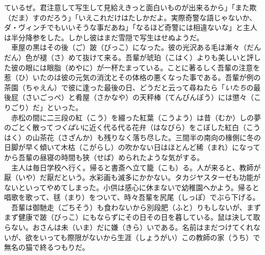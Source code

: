 \documentclass{book}
\begin{document}
ているぜ。君注意して写生して見給えきっと面白いものが出来るから」「また欺（だま）すのだろう」「いえこれだけはたしかだよ。実際奇警な語じゃないか、ダ・ヴィンチでもいいそうな事だあね」「なるほど奇警には相違ないな」と主人は半分降参をした。しかし彼はまだ雪隠で写生はせぬようだ。\\
　車屋の黒はその後（ご）跛（びっこ）になった。彼の光沢ある毛は漸々（だんだん）色が褪（さ）めて抜けて来る。吾輩が琥珀（こはく）よりも美しいと評した彼の眼には眼脂（めやに）が一杯たまっている。ことに著るしく吾輩の注意を惹（ひ）いたのは彼の元気の消沈とその体格の悪くなった事である。吾輩が例の茶園（ちゃえん）で彼に逢った最後の日、どうだと云って尋ねたら「\emph{いたち}の最後屁（さいごっぺ）と肴屋（さかなや）の天秤棒（てんびんぼう）には懲々（こりごり）だ」といった。\\
　赤松の間に二三段の紅（こう）を綴った紅葉（こうよう）は昔（むか）しの夢のごとく散って\emph{つくばい}に近く代る代る花弁（はなびら）をこぼした紅白（こうはく）の山茶花（さざんか）も残りなく落ち尽した。三間半の南向の椽側に冬の日脚が早く傾いて木枯（こがらし）の吹かない日はほとんど稀（まれ）になってから吾輩の昼寝の時間も狭（せば）められたような気がする。\\
　主人は毎日学校へ行く。帰ると書斎へ立て籠（こも）る。人が来ると、教師が厭（いや）だ厭だという。水彩画も滅多にかかない。タカジヤスターゼも功能がないといってやめてしまった。小供は感心に休まないで幼稚園へかよう。帰ると唱歌を歌って、毬（まり）をついて、時々吾輩を尻尾（しっぽ）でぶら下げる。\\
　吾輩は御馳走（ごちそう）も食わないから別段肥（ふと）りもしないが、まずまず健康で跛（びっこ）にもならずにその日その日を暮している。鼠は決して取らない。おさんは未（いま）だに嫌（きら）いである。名前はまだつけてくれないが、欲をいっても際限がないから生涯（しょうがい）この教師の家（うち）で無名の猫で終るつもりだ。\\
\end{document}
